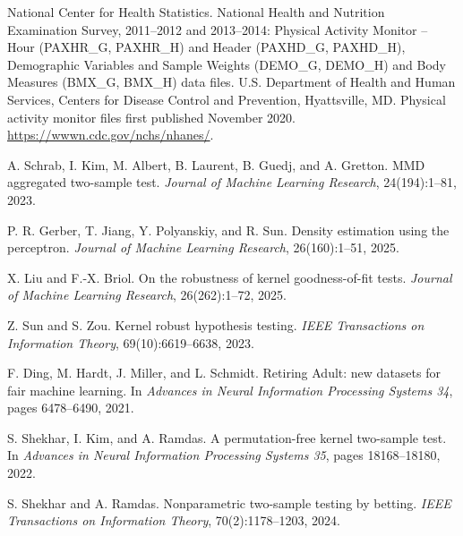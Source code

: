 
National Center for Health Statistics.
\newblock National Health and Nutrition Examination Survey, 2011--2012 and 2013--2014: Physical Activity Monitor -- Hour (PAXHR\_G, PAXHR\_H) and Header (PAXHD\_G, PAXHD\_H), Demographic Variables and Sample Weights (DEMO\_G, DEMO\_H) and Body Measures (BMX\_G, BMX\_H) data files.
\newblock U.S. Department of Health and Human Services, Centers for Disease Control and Prevention, Hyattsville, MD. Physical activity monitor files first published November 2020. \url{https://wwwn.cdc.gov/nchs/nhanes/}.

A. Schrab, I. Kim, M. Albert, B. Laurent, B. Guedj, and A. Gretton.
\newblock MMD aggregated two-sample test.
\newblock \emph{Journal of Machine Learning Research}, 24(194):1--81, 2023.

P. R. Gerber, T. Jiang, Y. Polyanskiy, and R. Sun.
\newblock Density estimation using the perceptron.
\newblock \emph{Journal of Machine Learning Research}, 26(160):1--51, 2025.

X. Liu and F.-X. Briol.
\newblock On the robustness of kernel goodness-of-fit tests.
\newblock \emph{Journal of Machine Learning Research}, 26(262):1--72, 2025.

Z. Sun and S. Zou.
\newblock Kernel robust hypothesis testing.
\newblock \emph{IEEE Transactions on Information Theory}, 69(10):6619--6638, 2023.

F. Ding, M. Hardt, J. Miller, and L. Schmidt.
\newblock Retiring Adult: new datasets for fair machine learning.
\newblock In \emph{Advances in Neural Information Processing Systems 34}, pages 6478--6490, 2021.

S. Shekhar, I. Kim, and A. Ramdas.
\newblock A permutation-free kernel two-sample test.
\newblock In \emph{Advances in Neural Information Processing Systems 35}, pages 18168--18180, 2022.

S. Shekhar and A. Ramdas.
\newblock Nonparametric two-sample testing by betting.
\newblock \emph{IEEE Transactions on Information Theory}, 70(2):1178--1203, 2024.


